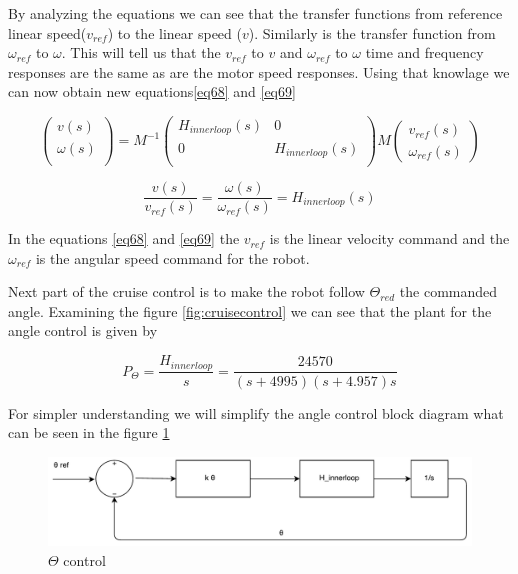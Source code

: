 By analyzing the equations we can see that the transfer functions from reference linear speed($v_{ref}$) to the linear speed ($v$). Similarly is the transfer function from $\omega_{ref}$ to $\omega$. This will tell us that the $v_{ref}$ to $v$ and $\omega_{ref}$ to $\omega$ time and frequency responses are the same as are the motor speed responses. Using that knowlage we can now obtain new equations\ref{eq68} and \ref{eq69}

\begin{equation} \label{eq68}
 \begin{pmatrix} 
 v(s) \\ 
 \omega(s) \\
 \end{pmatrix} 
 =
 M^{-1}
 \begin{pmatrix}  
 H_{innerloop}(s)   & 0 \\ 
 0 & H_{innerloop}(s) \\ 
 \end{pmatrix}
 M
 \begin{pmatrix} 
 v_{ref}(s) \\ 
 \omega_{ref}(s)
 \end{pmatrix} 
 \end{equation}

\begin{equation} \label{eq69}
\frac{v(s)}{v_{ref}(s)}
=
\frac{\omega(s)}{\omega_{ref}(s)}
=
H_{innerloop}(s)
\end{equation}

In the equations \ref{eq68} and \ref{eq69} the $v_{ref}$ is the linear velocity command and the $\omega_{ref}$ is the angular speed command for the robot.

Next part of the cruise control is to make the robot follow $\Theta_{red}$ the commanded angle. Examining the figure \ref{fig:cruisecontrol} we can see that the plant for the angle control is given by

\begin{equation} \label{eq70}
P_{\Theta}
=
\frac{H_{innerloop}}{s}
=
\frac{24570}{(s+4995)(s+4.957)s}
\end{equation}

For simpler understanding we will simplify the angle control block diagram what can be seen in the figure \ref{fig:anglecontrol}

\begin{figure} 
\centering
 	\includegraphics[width=1\textwidth]{figures/cropanglecontrol.pdf}
	
	
	\caption{$\Theta$ control} 
 	\label{fig:anglecontrol} 
\end{figure}

